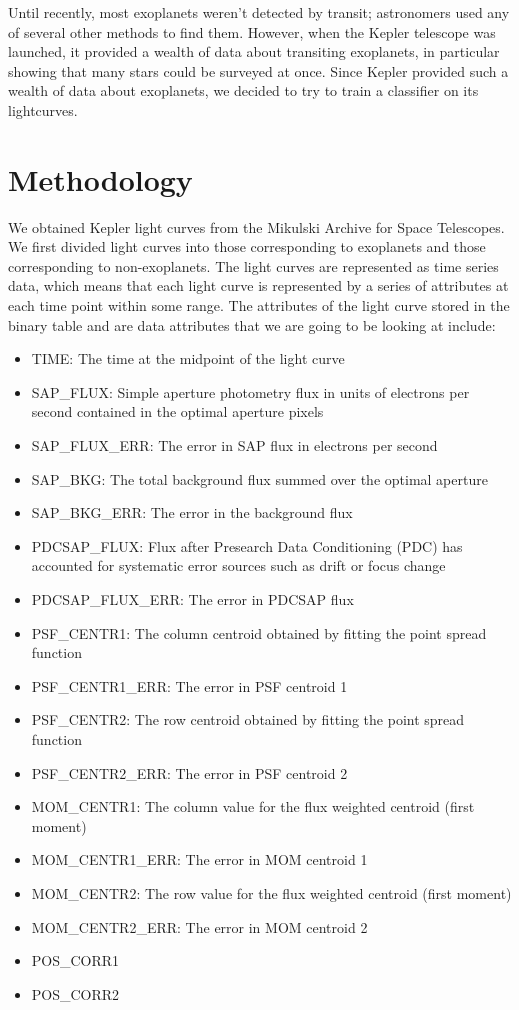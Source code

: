 \documentclass{amsart}
\begin{document}
Until recently, most exoplanets weren't detected by transit; astronomers used any of several other methods to find them. However, when the Kepler telescope was launched, it provided a wealth of data about transiting exoplanets, in particular showing that many stars could be surveyed at once. Since Kepler provided such a wealth of data about exoplanets, we decided to try to train a classifier on its lightcurves.%

\section{Methodology}
We obtained Kepler light curves from the Mikulski Archive for Space Telescopes. We first divided light curves into those corresponding to exoplanets and those corresponding to non-exoplanets. The light curves are represented as time series data, which means that each light curve is represented by a series of attributes at each time point within some range. The attributes of the light curve stored in the binary table and are data attributes that we are going to be looking at include:
\begin{itemize}
	\item TIME: The time at the midpoint of the light curve
	\item SAP\_FLUX: Simple aperture photometry flux in units of electrons per second contained in the optimal aperture pixels
	\item SAP\_FLUX\_ERR: The error in SAP flux in electrons per second
	\item SAP\_BKG: The total background flux summed over the optimal aperture
	\item SAP\_BKG\_ERR: The error in the background flux
	\item PDCSAP\_FLUX: Flux after Presearch Data Conditioning (PDC) has accounted for systematic error sources such as drift or focus change
	\item PDCSAP\_FLUX\_ERR: The error in PDCSAP flux
	\item PSF\_CENTR1: The column centroid obtained by fitting the point spread function
	\item PSF\_CENTR1\_ERR: The error in PSF centroid 1
	\item PSF\_CENTR2: The row centroid obtained by fitting the point spread function
	\item PSF\_CENTR2\_ERR: The error in PSF centroid 2
	\item MOM\_CENTR1: The column value for the flux weighted centroid (first moment)
	\item MOM\_CENTR1\_ERR: The error in MOM centroid 1
	\item MOM\_CENTR2: The row value for the flux weighted centroid (first moment)
	\item MOM\_CENTR2\_ERR: The error in MOM centroid 2
	\item POS\_CORR1
	\item POS\_CORR2
\end{itemize}
\end{document}
